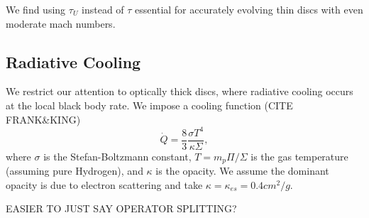 \documentclass{emulateapj}
\newcommand{\sig}{\sigma}
\newcommand{\Sig}{\Sigma}
\newcommand{\ka}{\kappa}
\begin{document}
We find using $\tau_U$ instead of $\tau$ essential for accurately evolving thin discs with even moderate mach numbers.

\subsection{Radiative Cooling}
\label{subsec:cooling}

We restrict our attention to optically thick discs, where radiative cooling occurs at the local black body rate. We impose a cooling function (CITE FRANK\&KING)
\begin{equation}
	\dot{Q} = \frac{8}{3} \frac{\sig T^4}{\ka \Sig} , \label{eq:BBcooling}
\end{equation}
where $\sig$ is the Stefan-Boltzmann constant, $T = m_p \Pi / \Sig$ is the gas temperature (assuming pure Hydrogen), and $\ka $ is the opacity.  We assume the dominant opacity is due to electron scattering and take $\ka = \ka_{es} = 0.4 cm^2/g$.

EASIER TO JUST SAY OPERATOR SPLITTING?
\end{document}
